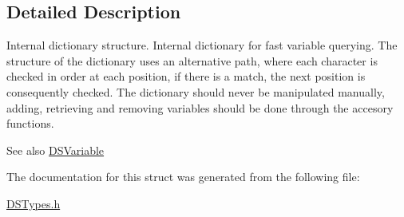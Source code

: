 \subsection{Detailed Description}
Internal dictionary structure. Internal dictionary for fast variable querying. The structure of the dictionary uses an alternative path, where each character is checked in order at each position, if there is a match, the next position is consequently checked. The dictionary should never be manipulated manually, adding, retrieving and removing variables should be done through the accesory functions.

\begin{DoxySeeAlso}{See also}
\hyperlink{struct_d_s_variable}{DSVariable} 
\end{DoxySeeAlso}


The documentation for this struct was generated from the following file:\begin{DoxyCompactItemize}
\item 
\hyperlink{_d_s_types_8h}{DSTypes.h}\end{DoxyCompactItemize}
